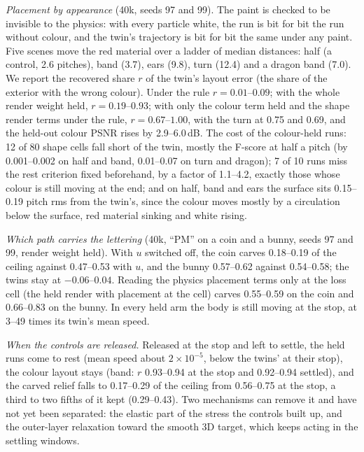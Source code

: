 \textit{Placement by appearance} (40k, seeds 97 and 99). The paint is checked to be invisible to the physics: with every
particle white, the run is bit for bit the run without colour, and the twin's trajectory is bit for bit the same under any
paint. Five scenes move the red material over a ladder of median distances: half (a control, 2.6 pitches), band (3.7),
ears (9.8), turn (12.4) and a dragon band (7.0). We report the recovered share $r$ of the twin's layout error (the share
of the exterior with the wrong colour). Under the rule $r=0.01$--$0.09$; with the whole render weight held,
$r=0.19$--$0.93$; with only the colour term held and the shape render terms under the rule, $r=0.67$--$1.00$, with the
turn at 0.75 and 0.69, and the held-out colour PSNR rises by 2.9--6.0\,dB. The cost of the colour-held runs: 12 of 80
shape cells fall short of the twin, mostly the F-score at half a pitch (by 0.001--0.002 on half and band, 0.01--0.07 on
turn and dragon); 7 of 10 runs miss the rest criterion fixed beforehand, by a factor of 1.1--4.2, exactly those whose
colour is still moving at the end; and on half, band and ears the surface sits 0.15--0.19 pitch rms from the twin's, since
the colour moves mostly by a circulation below the surface, red material sinking and white rising.

\textit{Which path carries the lettering} (40k, ``PM'' on a coin and a bunny, seeds 97 and 99, render weight held). With
$u$ switched off, the coin carves 0.18--0.19 of the ceiling against 0.47--0.53 with $u$, and the bunny 0.57--0.62 against
0.54--0.58; the twins stay at $-0.06$--$0.04$. Reading the physics placement terms only at the loss cell (the held render
with placement at the cell) carves 0.55--0.59 on the coin and 0.66--0.83 on the bunny. In every held arm the body is still
moving at the stop, at 3--49 times its twin's mean speed.

\textit{When the controls are released.} Released at the stop and left to settle, the held runs come to rest (mean speed
about $2\times10^{-5}$, below the twins' at their stop), the colour layout stays (band: $r$ 0.93--0.94 at the stop and
0.92--0.94 settled), and the carved relief falls to 0.17--0.29 of the ceiling from 0.56--0.75 at the stop, a third to two
fifths of it kept (0.29--0.43). Two mechanisms can remove it and have not yet been separated: the elastic part of the
stress the controls built up, and the outer-layer relaxation toward the smooth 3D target, which keeps acting in the
settling windows.

